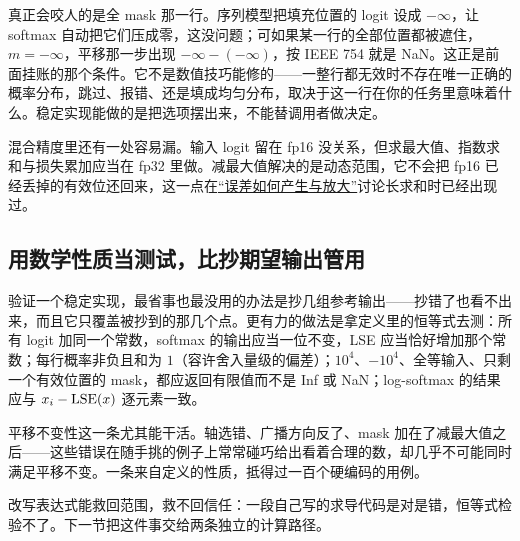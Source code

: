 真正会咬人的是全 mask 那一行。序列模型把填充位置的 logit 设成 \(-\infty\)，让 softmax 自动把它们压成零，这没问题；可如果某一行的全部位置都被遮住，\(m=-\infty\)，平移那一步出现 \(-\infty-(-\infty)\)，按 IEEE 754 就是 NaN。这正是前面挂账的那个条件。它不是数值技巧能修的——一整行都无效时不存在唯一正确的概率分布，跳过、报错、还是填成均匀分布，取决于这一行在你的任务里意味着什么。稳定实现能做的是把选项摆出来，不能替调用者做决定。

混合精度里还有一处容易漏。输入 logit 留在 fp16 没关系，但求最大值、指数求和与损失累加应当在 fp32 里做。减最大值解决的是动态范围，它不会把 fp16 已经丢掉的有效位还回来，这一点在\hyperref[sec:08-Numerical-Analysis/01-Floating-Point-and-Error/02]{``误差如何产生与放大''}讨论长求和时已经出现过。

\subsection{用数学性质当测试，比抄期望输出管用}

验证一个稳定实现，最省事也最没用的办法是抄几组参考输出——抄错了也看不出来，而且它只覆盖被抄到的那几个点。更有力的做法是拿定义里的恒等式去测：所有 logit 加同一个常数，softmax 的输出应当一位不变，LSE 应当恰好增加那个常数；每行概率非负且和为 \(1\)（容许舍入量级的偏差）；\(10^4\)、\(-10^4\)、全等输入、只剩一个有效位置的 mask，都应返回有限值而不是 Inf 或 NaN；log-softmax 的结果应与 \(x_i-\operatorname{LSE}(x)\) 逐元素一致。

平移不变性这一条尤其能干活。轴选错、广播方向反了、mask 加在了减最大值之后——这些错误在随手挑的例子上常常碰巧给出看着合理的数，却几乎不可能同时满足平移不变。一条来自定义的性质，抵得过一百个硬编码的用例。

改写表达式能救回范围，救不回信任：一段自己写的求导代码是对是错，恒等式检验不了。下一节把这件事交给两条独立的计算路径。
